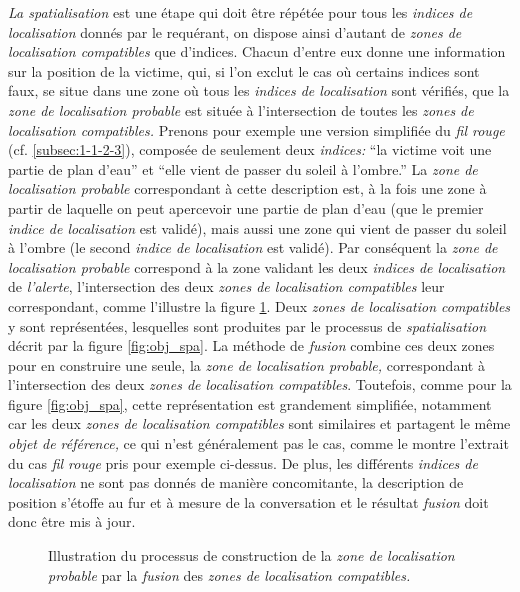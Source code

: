 \emph{La spatialisation} est une étape qui doit être répétée pour tous
les \emph{indices de localisation} donnés par le requérant, on dispose
ainsi d'autant de \emph{zones de localisation compatibles} que
d'indices. Chacun d'entre eux donne une information sur la position de
la victime, qui, si l'on exclut le cas où certains indices sont faux,
se situe dans une zone où tous les \emph{indices de localisation} sont
vérifiés, \ie que la \emph{zone de localisation probable} est située à
l'intersection de toutes les \emph{zones de localisation compatibles.}
%
Prenons pour exemple une version simplifiée du \emph{fil rouge}
(cf. \autoref{subsec:1-1-2-3}), composée de seulement deux
\emph{indices:} \enquote{la victime voit une partie de plan d'eau} et
\enquote{elle vient de passer du soleil à l'ombre.}  La \emph{zone de
  localisation probable} correspondant à cette description est, à la
fois une zone à partir de laquelle on peut apercevoir une partie de
plan d'eau (\ie que le premier \emph{indice de localisation} est
validé), mais aussi une zone qui vient de passer du soleil à l'ombre
(\ie le second \emph{indice de localisation} est validé). Par
conséquent la \emph{zone de localisation probable} correspond à la
zone validant les deux \emph{indices de localisation} de
\emph{l'alerte}, \ie l'intersection des deux \emph{zones de
  localisation compatibles} leur correspondant, comme l'illustre la
figure \ref{fig:obj_fus}. Deux \emph{zones de localisation
  compatibles} y sont représentées, lesquelles sont produites par le
processus de \emph{spatialisation} décrit par la figure
\ref{fig:obj_spa}. La méthode de \emph{fusion} combine ces deux zones
pour en construire une seule, la \emph{zone de localisation probable,}
correspondant à l'intersection des deux \emph{zones de localisation
  compatibles}. Toutefois, comme pour la figure \ref{fig:obj_spa},
cette représentation est grandement simplifiée, notamment car les deux
\emph{zones de localisation compatibles} sont similaires et partagent
le même \emph{objet de référence,} ce qui n'est généralement pas le
cas, comme le montre l'extrait du cas \emph{fil rouge} pris pour
exemple ci-dessus. De plus, les différents \emph{indices de
  localisation} ne sont pas donnés de manière concomitante, la
description de position s'étoffe au fur et à mesure de la conversation
et le résultat \emph{fusion} doit donc être mis à jour.

\begin{figure}
  \centering
  
  \caption{Illustration du processus de construction de la \emph{zone
      de localisation probable} par la \emph{fusion} des \emph{zones
      de localisation compatibles.}}
  \label{fig:obj_fus}
\end{figure}

